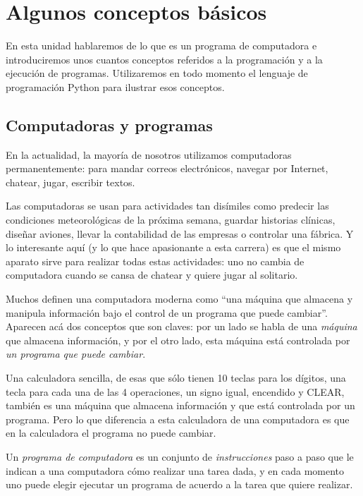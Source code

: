 \chapter[Conceptos básicos]{Algunos conceptos básicos}
\label{chapter:conceptos}

En esta unidad hablaremos de lo que es un programa de
computadora e introduciremos unos cuantos conceptos referidos a la
programación y a la ejecución de programas. Utilizaremos en todo
momento el lenguaje de programación Python para ilustrar esos
conceptos.

\section{Computadoras y programas}

En la actualidad, la mayoría de nosotros utilizamos computadoras
permanentemente: para mandar correos electrónicos, navegar por Internet,
chatear, jugar, escribir textos.

Las computadoras se usan para actividades tan disímiles como predecir las
condiciones meteorológicas de la próxima semana, guardar historias clínicas,
diseñar aviones, llevar la contabilidad de las empresas o controlar una
fábrica. Y lo interesante aquí (y lo que hace apasionante a esta carrera) es
que el mismo aparato sirve para realizar todas estas actividades: uno no
cambia de computadora cuando se cansa de chatear y quiere jugar al solitario.

Muchos definen una computadora moderna como \enquote{una máquina que
almacena y manipula información bajo el control de un programa que
puede cambiar}. Aparecen acá dos conceptos que son claves: por un
lado se habla de una \emph{máquina} que almacena información, y por
el otro lado, esta máquina está controlada por \emph{un programa
que puede cambiar}.

Una calculadora sencilla, de esas que sólo tienen 10 teclas para
los dígitos, una tecla para cada una de las 4 operaciones, un
signo igual, encendido y CLEAR, también es una máquina que
almacena información y que está controlada por un programa. Pero
lo que diferencia a esta calculadora de una computadora es que en
la calculadora el programa no puede cambiar.

Un \emph{programa de computadora} es un conjunto de \emph{instrucciones}
paso a paso que le indican a una computadora cómo
realizar una tarea dada, y en cada momento uno puede elegir
ejecutar un programa de acuerdo a la tarea que quiere realizar.

